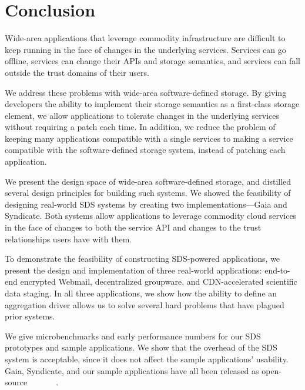 \chapter{Conclusion}
\label{chap:conclusion}

Wide-area applications that leverage commodity infrastructure are difficult to
keep running in the face of changes in the underlying services.  Services can go
offline, services can change their APIs and storage semantics, and services can
fall outside the trust domains of their users.

We address these problems with wide-area software-defined storage.  By giving
developers the ability to implement their storage semantics as a first-class
storage element, we allow applications to tolerate changes in the underlying
services without requiring a patch each time.  In addition, we reduce the
problem of keeping many applications compatible with a single services to making a
service compatible with the software-defined storage system, instead of patching
each application.

We present the design space of wide-area software-defined storage, and
distilled several design principles for building such systems.  We showed the
feasibility of designing real-world SDS systems by creating two
implementations---Gaia and Syndicate.  Both systems allow applications to
leverage commodity cloud services in the face of changes to both the service API
and changes to the trust relationships users have with them.

To demonstrate the feasibility of constructing SDS-powered applications, we
present the design and implementation of three real-world applications:
end-to-end encrypted Webmail, decentralized groupware, and CDN-accelerated
scientific data staging.  In all three applications, we show how the ability to
define an aggregation driver allows us to solve several hard problems that have
plagued prior systems.

We give microbenchmarks and early performance numbers for our SDS prototypes and
sample applications.  We show that the overhead of the SDS system is acceptable,
since it does not affect the sample applications' usability.
Gaia, Syndicate, and our sample applications have all been released as
open-source~\cite{blockstack-core}~\cite{syndicate-storage}~\cite{syndicatemail}~\cite{todo-list}~\cite{blockstack-browser}~\cite{syndicate-sdm}~\cite{syndicate-containers}.

